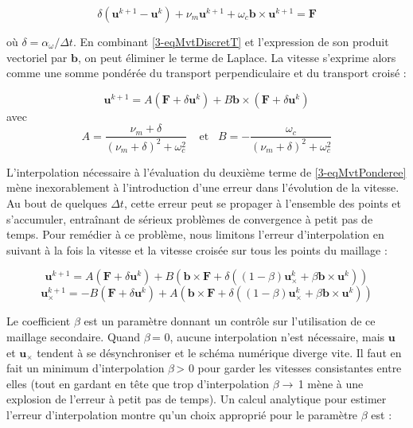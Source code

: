 \begin{refsection}
\begin{equation}
\label{3-eqMvtDiscretT}
\delta\left(\mathbf{u}^{k+1}-\mathbf{u}^{k}\right) + 
\nu_m\mathbf{u}^{k+1}+\omega_{c}\mathbf{b}\times\mathbf{u}^{k+1}=
\mathbf F
\end{equation}

où $\delta=\alpha_\omega/\Delta t$. En combinant \ref{3-eqMvtDiscretT} et
l'expression de son produit vectoriel par $\mathbf b$, on peut éliminer le
terme de Laplace. La vitesse s'exprime alors comme une somme pondérée du
transport perpendiculaire et du transport croisé :

\begin{equation}
\label{3-eqMvtPonderee}
\mathbf{u}^{k+1}=A\left(\mathbf F + \delta\mathbf{u}^{k}\right)+ B\mathbf
b\times\left(\mathbf F + \delta\mathbf{u}^{k}\right)
\end{equation}
avec 
\begin{equation*}
\label{3-coefficientsVitesses}
A=\frac{\nu_m+\delta}{(\nu_m+\delta)^2+\omega_c^2}\;\;\;\;\text{et}\;\;\;B=-\frac{\omega_c}{(\nu_m+\delta)^2+\omega_c^2}
\end{equation*}

L'interpolation nécessaire à l'évaluation du
deuxième terme de \eqref{3-eqMvtPonderee} mène
inexorablement à l'introduction d'une erreur dans l'évolution de la vitesse. Au
bout de quelques $\Delta t$, cette erreur peut se propager à l'ensemble des
points et s'accumuler, entraînant de sérieux problèmes de convergence à petit
pas de temps. Pour remédier à ce problème, nous limitons l'erreur
d'interpolation en suivant à la fois la vitesse et la vitesse croisée sur tous
les points du maillage :

\begin{equation}
\label{3-eqMvtPonderee}
\mathbf{u}^{k+1}=A\left(\mathbf F + \delta\mathbf{u}^{k}\right)+ B\left(\mathbf
b\times\mathbf F +
\delta\left((1-\beta)\mathbf{u}_\times^{k}+\beta\mathbf
b\times\mathbf{u}^{k}\right)\right)
\end{equation}
\begin{equation}
\label{3-eqMvtPonderee}
\mathbf{u}_\times^{k+1}=-B\left(\mathbf F + \delta\mathbf{u}^{k}\right)+
A\left(\mathbf
b\times\mathbf F +
\delta\left((1-\beta)\mathbf{u}_\times^{k}+\beta\mathbf
b\times\mathbf{u}^{k}\right)\right)
\end{equation}

Le coefficient $\beta$ est un paramètre donnant un contrôle sur
l'utilisation de ce maillage secondaire. Quand $\beta\,$= 0, aucune
interpolation n'est nécessaire, mais $\mathbf{u}$ et $\mathbf{u}_\times$
tendent à se désynchroniser et le schéma numérique diverge vite. Il faut en
fait un minimum d'interpolation $\beta\,$> 0 pour garder les vitesses
consistantes entre elles (tout en gardant en tête que trop d'interpolation
$\beta\rightarrow\,$1 mène à une explosion de l'erreur à petit pas de temps). Un
calcul analytique pour estimer l'erreur d'interpolation montre qu'un choix approprié pour le paramètre $\beta$
est :


\end{refsection}
